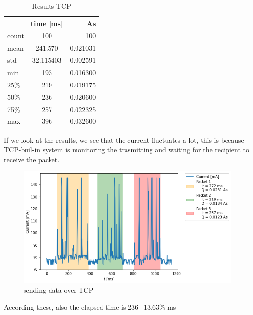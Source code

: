 \begin{table}[htbp]
\begin{center}
\caption{Results TCP}
\label{tab:table1}
\renewcommand{\arraystretch}{1.8}
\begin{tabular}{l|c|r}
& \textbf{time [ms]} & \textbf{As}\\
\hline
count & 100 & 100\\
mean & 241.570 & 0.021031\\
std & 32.115403 & 0.002591\\
min & 193 & 0.016300\\
25\%  & 219 & 0.019175\\
50\% & 236 & 0.020600\\
75\%  & 257 & 0.022325\\
max & 396 & 0.032600\\
\end{tabular}
\end{center}
\end{table}
\linebreak
If we look at the results, we see that the current fluctuates a lot,
this is because TCP-buil-in system is monitoring the trasmitting 
and waiting for the recipient to receive the packet.\linebreak\linebreak
\begin{figure}[h!]
\centering
\includegraphics[width = 1 \linewidth]{fig/udp_tcp/tcp_s_m.png}
\caption{sending data over TCP}
\label{fig:tcp_s_m}
\end{figure}
\linebreak\linebreak
According these, also the elapsed time is 236$\pm$13.63\% ms
\linebreak
